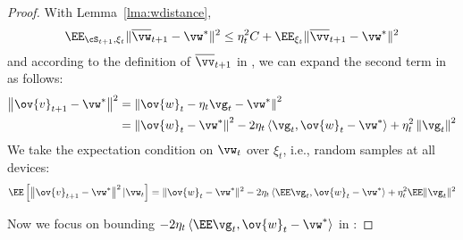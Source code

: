 \begin{proof}
With Lemma~\ref{lma:wdistance}, 
\begin{align}
	\EE_{\cS_{t+1}, \xi_{t}} \|\overline{\vw}_{t+1} - \vw^*\|^2 \leq \eta_t^2 C + \EE_{\xi_t} \|\overline{\vv}_{t+1} - \vw^*\|^2\label{eq:sgdcvxsmth1}
\end{align}
and according to the definition of $\overline{\vv}_{t+1}$ in \eq{\ref{eq:vbar}}, we can expand the second term in \eq{\ref{eq:sgdcvxsmth1}} as follows:
\begin{align*}
\left\|\ov{v}_{t+1}-\vw^{*}\right\|^2 
 &=\left\|\ov{w}_{t}-\eta_{t} \vg_{t}-\vw^{*}\right\|^2 \\
 &=\left\|\ov{w}_{t}-\vw^{*}\right\|^{2}-2 \eta_{t} \left< \vg_{t}, \ov{w}_{t}-\vw^{*} \right>+\eta_{t}^{2}\left\|\vg_{t}\right\|^{2} 
\end{align*}
We take the expectation condition on $\vw_t$ over $\xi_t$, i.e., random samples at all devices:
\begin{align}
\EE\left[\left\|\ov{v}_{t+1}-\vw^{*}\right\|^2| \vw_{t}\right]=\|\ov{w}_{t}-\vw^{*}\|^{2}-2 \eta_{t} \left<\EE \vg_{t}, \ov{w}_{t}-\vw^{*} \right> +\eta_{t}^{2} \EE\| \vg_{t} \|^{2}
\label{eq:expandsgd}
\end{align}

Now we focus on bounding $-2 \eta_{t} \left< \EE \vg_{t}, \ov{w}_{t}-\vw^{*}\right>$ in \eq{\ref{eq:expandsgd}}: 


\end{proof}
